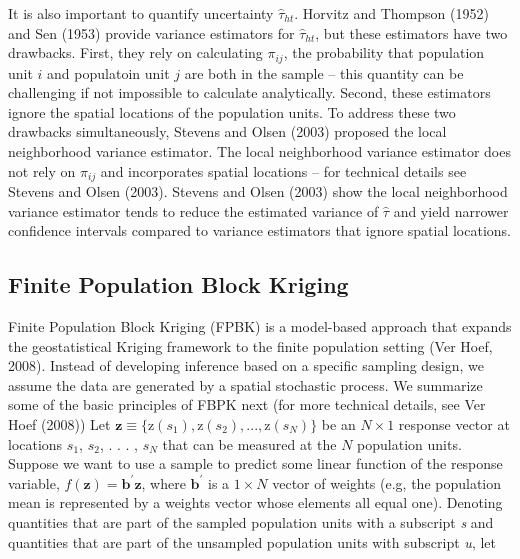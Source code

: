 \documentclass[]{elsarticle} %
\begin{document}
It is also important to quantify uncertainty \(\hat{\tau}_{ht}\).
Horvitz and Thompson (1952) and Sen (1953) provide variance estimators
for \(\hat{\tau}_{ht}\), but these estimators have two drawbacks. First,
they rely on calculating \(\pi_{ij}\), the probability that population
unit \(i\) and populatoin unit \(j\) are both in the sample -- this
quantity can be challenging if not impossible to calculate analytically.
Second, these estimators ignore the spatial locations of the population
units. To address these two drawbacks simultaneously, Stevens and Olsen
(2003) proposed the local neighborhood variance estimator. The local
neighborhood variance estimator does not rely on \(\pi_{ij}\) and
incorporates spatial locations -- for technical details see Stevens and
Olsen (2003). Stevens and Olsen (2003) show the local neighborhood
variance estimator tends to reduce the estimated variance of
\(\hat{\tau}\) and yield narrower confidence intervals compared to
variance estimators that ignore spatial locations.

\hypertarget{finite-population-block-kriging}{%
\subsection{Finite Population Block
Kriging}\label{finite-population-block-kriging}}

Finite Population Block Kriging (FPBK) is a model-based approach that
expands the geostatistical Kriging framework to the finite population
setting (Ver Hoef, 2008). Instead of developing inference based on a
specific sampling design, we assume the data are generated by a spatial
stochastic process. We summarize some of the basic principles of FBPK
next (for more technical details, see Ver Hoef (2008)) Let
\({\mathbf{z} \equiv \{\text{z}(s_1), \text{z}(s_2), . . . , \text{z}(s_N) \}}\)
be an \(N \times 1\) response vector at locations \(s_1\), \(s_2\), . .
. , \(s_N\) that can be measured at the \(N\) population units. Suppose
we want to use a sample to predict some linear function of the response
variable, \(f(\mathbf{z}) = \mathbf{b}^\prime \mathbf{z}\), where
\(\mathbf{b}^\prime\) is a \(1 \times N\) vector of weights (e.g, the
population mean is represented by a weights vector whose elements all
equal one). Denoting quantities that are part of the sampled population
units with a subscript \emph{s} and quantities that are part of the
unsampled population units with subscript \emph{u}, let
\end{document}
